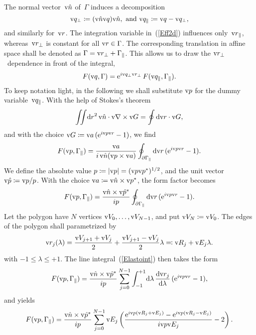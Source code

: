 The normal vector~$\text{v}{\hat n}$ of~$\Gamma$ induces a decomposition
\begin{equation}
  \text{v}{q}_\perp\coloneqq(\text{v}{\hat n}\text{v}{q})\text{v}{\hat n},\text{~and~}\text{v}{q}_\parallel\coloneqq\text{v}{q}-\text{v}{q}_\perp,
\end{equation}
and similarly for~$\text{v}{r}$.
The integration variable in~(\ref{Eff2d}) influences only~$\text{v}{r}_\parallel$,
whereas~$\text{v}{r}_\perp$ is constant for all $\text{v}{r}\in\Gamma$.
The corresponding translation in affine space
shall be denoted as $\Gamma=\text{v}{r}_\perp+\Gamma_\parallel$.
This allows us to draw the $\text{v}{r}_\perp$~dependence in front of the integral,
\begin{equation}
  F(\text{v}{q},\Gamma)
  = \text{e}^{i\text{v}{q}_\perp\text{v}{r}_\perp}\,F(\text{v}{q}_\parallel,\Gamma_\parallel).
\end{equation}
To keep notation light,
in the following we shall substitute $\text{v}{p}$ for the dummy variable~$\text{v}{q}_\parallel$.
With the help of Stokes's theorem
\begin{equation}\label{EStokes}
  \iint\!\text{d} r^2\,\text{v}{\hat n}\cdot\text{v}{\nabla}\times\text{v}{G} = \oint \text{d}\text{v}{r}\cdot\text{v}{G},
\end{equation}
and with the choice $\text{v}{G}\coloneqq\text{v}{a}\, (\text{e}^{i\text{v}{p}\text{v}{r}}-1)$,
we find
\begin{equation}
  F(\text{v}{p},\Gamma_\parallel)=\frac{\text{v}{a}}{i\, \text{v}{\hat n}(\text{v}{p}\times\text{v}{a})} \oint_{\partial\Gamma_\parallel} \text{d}\text{v}{r}\,(\text{e}^{i\text{v}{p}\text{v}{r}}-1).
\end{equation}
We define the absolute value
$p\coloneqq|\text{v}{p}|=(\text{v}{p}\text{v}{p}^*)^{1/2}$,
and the unit vector $\text{v}{\hat p}\coloneqq\text{v}{p}/p$.
With the choice $\text{v}{a}\coloneqq\text{v}{\hat n}\times\text{v}{p}^*$,
the form factor becomes
\begin{equation}\label{Elastoint}
  F(\text{v}{p},\Gamma_\parallel)=\frac{\text{v}{\hat n}\times\text{v}{\hat p}^*}{ip} \oint_{\partial\Gamma_\parallel} \text{d}\text{v}{r}\,(\text{e}^{i\text{v}{p}\text{v}{r}}-1).
\end{equation}
Let the polygon have $N$ vertices $\text{v}{V}_0,\ldots,\text{v}{V}_{N-1}$,
and put $\text{v}{V}_N\coloneqq\text{v}{V}_0$.
The edges of the polygon shall parametrized by
\begin{equation}
  \text{v}{r}_j(\lambda) = \frac{\text{v}{V}_{j+1}+\text{v}{V}_j}{2} + \frac{\text{v}{V}_{j+1}-\text{v}{V}_j}{2} \lambda
  \eqqcolon \text{v}{R}_j + \text{v}{E}_j\lambda.
\end{equation}
with $-1\le\lambda\le+1$.
The line integral~(\ref{Elastoint}) then takes the form
\begin{equation}
    F(\text{v}{p},\Gamma_\parallel)
   = \frac{\text{v}{\hat n}\times\text{v}{\hat p}^*}{ip} \sum_{j=0}^{N-1}
              \int_{-1}^{+1}\!\text{d}\lambda\, \frac{\text{d}\text{v}{r}_j}{\text{d}\lambda}\,(\text{e}^{i\text{v}{p}\text{v}{r}}-1),
\end{equation}
and yields
\begin{equation}\label{Effpolygon1}
    F(\text{v}{p},\Gamma_\parallel)
    = \frac{\text{v}{\hat n}\times\text{v}{\hat p}^*}{ip}
      \sum_{j=0}^{N-1} \text{v}{E}_j
      \left( \frac{\text{e}^{i\text{v}{p}(\text{v}{R}_j+\text{v}{E}_j)}-\text{e}^{i\text{v}{p}(\text{v}{R}_j-\text{v}{E}_j)}}{i\text{v}{p}\text{v}{E}_j} - 2 \right).
\end{equation}
